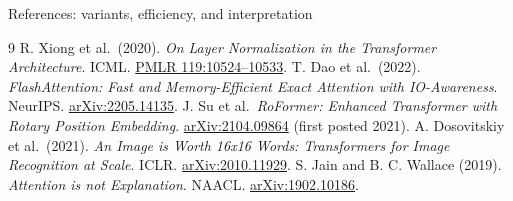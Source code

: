 \documentclass[aspectratio=169,11pt]{beamer}
\begin{document}
\begin{frame}[t]{References: variants, efficiency, and interpretation}
\footnotesize
\begin{thebibliography}{9}
R. Xiong et al.\ (2020). \emph{On Layer Normalization in the Transformer Architecture}. ICML.
\href{https://proceedings.mlr.press/v119/xiong20b.html}{PMLR 119:10524--10533}.
T. Dao et al.\ (2022). \emph{FlashAttention: Fast and Memory-Efficient Exact Attention with IO-Awareness}. NeurIPS.
\href{https://arxiv.org/abs/2205.14135}{arXiv:2205.14135}.
J. Su et al.\ \emph{RoFormer: Enhanced Transformer with Rotary Position Embedding}.
\href{https://arxiv.org/abs/2104.09864}{arXiv:2104.09864} (first posted 2021).
A. Dosovitskiy et al.\ (2021). \emph{An Image is Worth 16x16 Words: Transformers for Image Recognition at Scale}. ICLR.
\href{https://arxiv.org/abs/2010.11929}{arXiv:2010.11929}.
S. Jain and B. C. Wallace (2019). \emph{Attention is not Explanation}. NAACL.
\href{https://arxiv.org/abs/1902.10186}{arXiv:1902.10186}.
\end{thebibliography}
\end{frame}
\end{document}
